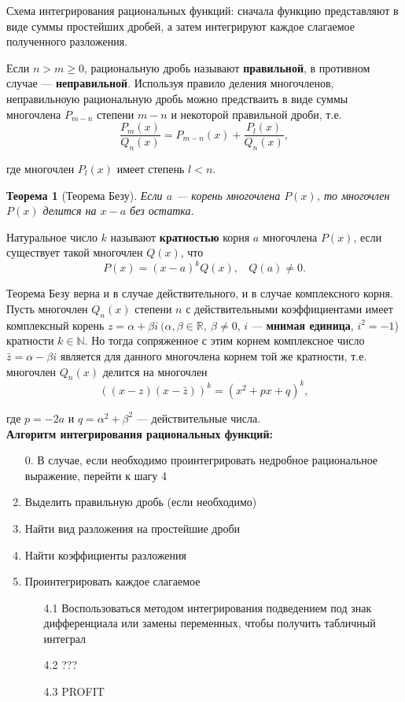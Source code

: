 \documentclass[12pt]{article}
\numberwithin{equation}{section}
\newtheorem{theorem}{Теорема}[section]
\begin{document}
Схема интегрирования рациональных функций: сначала функцию представляют в виде суммы простейших дробей, а затем интегрируют каждое слагаемое полученного разложения.

Если $n > m \geqslant 0$,  рациональную дробь называют \textbf{правильной}, в противном случае --- \textbf{неправильной}. Используя правило деления многочленов, неправильноую рациональную дробь можно предстваить в виде суммы многочлена $P_{m-n}$ степени  $m-n$ и некоторой правильной дроби, т.е.
\[ \frac{P_m(x)}{Q_n(x)} = P_{m-n}(x) + \frac{P_l(x)}{Q_n(x)},\]

где многочлен $P_l(x)$ имеет степень $l < n$.

\begin{theorem}[Теорема Безу]
Если $a$ --- корень многочлена $P(x)$, то многочлен $P(x)$ делится на $x-a$ без остатка.
\end{theorem}
 
Натуральное число $k$ называют \textbf{кратностью} корня $a$ многочлена $P(x)$, если существует такой многочлен $Q(x)$, что
\[ P(x) = (x-a)^k Q(x),~~~~Q(a) \neq 0.\]

Теорема Безу верна и в случае действительного, и в случае комплексного корня. Пусть многочлен $Q_n(x)$ степени $n$ с действительными коэффициентами имеет комплексный корень $z = \alpha + \beta i~(\alpha, \beta \in \mathbb{R},~\beta \neq 0$, $i$ --- \textbf{мнимая единица}, $i^2 = -1$) кратности $k \in \mathbb{N}$. Но тогда сопряженное с этим корнем комплексное число $\bar{z} = \alpha - \beta i$ является для данного многочлена корнем той же кратности, т.е. многочлен $Q_n(x)$ делится на многочлен
\[ ((x-z)(x-\bar{z}))^k = (x^2 + px + q)^k,\]

где $p = -2a$ и $q = \alpha^2 + \beta^2$ --- действительные числа.\\

\textbf{Алгоритм интегрирования рациональных функций:}

\begin{enumerate}
\item [0.] В случае, если необходимо проинтегрировать недробное рациональное выражение, перейти к шагу 4
\item Выделить правильную дробь (если необходимо)
\item Найти вид разложения на простейшие дроби
\item Найти коэффициенты разложения
\item Проинтегрировать каждое слагаемое
    \begin{enumerate}
    \item [4.1] Воспользоваться методом интегрирования подведением под знак дифференциала или замены переменных, чтобы получить табличный интеграл
    \item [4.2] ???
    \item [4.3] PROFIT
    \end{enumerate}
\end{enumerate}
\end{document}
